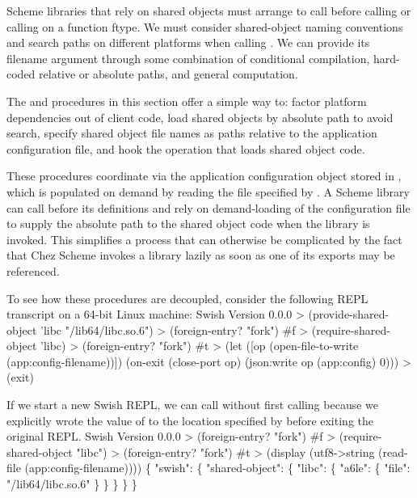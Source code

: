 Scheme libraries that rely on shared objects must arrange
to call  before calling  or
calling  on a function ftype.
We must consider shared-object naming conventions and search paths on
different platforms when calling .
We can provide its filename argument through some combination of conditional
compilation, hard-coded relative or absolute paths, and general computation.

The  and  procedures
in this section offer a simple way to:
factor platform dependencies out of client code,
load shared objects by absolute path to avoid search,
specify shared object file names as paths relative
to the application configuration file, and
hook the operation that loads shared object code.

These procedures coordinate via the application configuration object stored in
, which is populated on demand by reading the file specified
by .
A Scheme library can call  before its
 definitions and rely on demand-loading of the
configuration file to supply the absolute path to the shared object code when
the library is invoked.
This simplifies a process that can otherwise be complicated
by the fact that Chez Scheme invokes a library lazily as soon as
one of its exports may be referenced.

To see how these procedures are decoupled, consider the following REPL
transcript on a 64-bit Linux machine:
\codebegin
Swish Version 0.0.0
> (provide-shared-object 'libc "/lib64/libc.so.6")
> (foreign-entry? "fork")
#f
> (require-shared-object 'libc)
> (foreign-entry? "fork")
#t
> (let ([op (open-file-to-write (app:config-filename))])
    (on-exit (close-port op)
      (json:write op (app:config) 0)))
> (exit)
\codeend

If we start a new Swish REPL, we can call 
without first calling 
because we explicitly wrote the value of  to the location
specified by  before exiting the original REPL.
\codebegin
Swish Version 0.0.0
> (foreign-entry? "fork")
#f
> (require-shared-object "libc")
> (foreign-entry? "fork")
#t
> (display (utf8->string (read-file (app:config-filename))))
\{
  "swish": \{
    "shared-object": \{
      "libc": \{
        "a6le": \{
          "file": "/lib64/libc.so.6"
        \}
      \}
    \}
  \}
\}
\codeend

